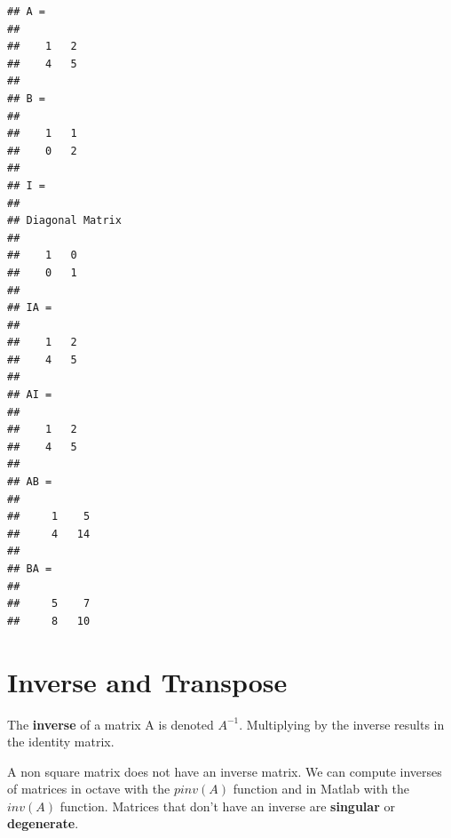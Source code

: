 \documentclass[
]{book}
\newenvironment{Shaded}{\begin{snugshade}}{\end{snugshade}}
\newcommand{\BuiltInTok}[1]{#1}
\newcommand{\CommentTok}[1]{\textcolor[rgb]{0.56,0.35,0.01}{\textit{#1}}}
\newcommand{\FloatTok}[1]{\textcolor[rgb]{0.00,0.00,0.81}{#1}}
\newcommand{\FunctionTok}[1]{\textcolor[rgb]{0.00,0.00,0.00}{#1}}
\newcommand{\NormalTok}[1]{#1}
\newcommand{\OperatorTok}[1]{\textcolor[rgb]{0.81,0.36,0.00}{\textbf{#1}}}
\begin{document}
\begin{Shaded}
\end{Shaded}

\begin{verbatim}
## A =
## 
##    1   2
##    4   5
## 
## B =
## 
##    1   1
##    0   2
## 
## I =
## 
## Diagonal Matrix
## 
##    1   0
##    0   1
## 
## IA =
## 
##    1   2
##    4   5
## 
## AI =
## 
##    1   2
##    4   5
## 
## AB =
## 
##     1    5
##     4   14
## 
## BA =
## 
##     5    7
##     8   10
\end{verbatim}

\hypertarget{inverse-and-transpose}{%
\section{Inverse and Transpose}\label{inverse-and-transpose}}

The \textbf{inverse} of a matrix A is denoted \(A^{-1}\). Multiplying by the inverse results in the identity matrix.

A non square matrix does not have an inverse matrix. We can compute inverses of matrices in octave with the \(pinv(A)\) function and in Matlab with the \(inv(A)\) function. Matrices that don't have an inverse are \textbf{singular} or \textbf{degenerate}.
\end{document}
